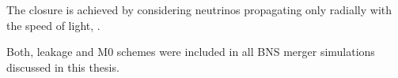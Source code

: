 %
%
%
The closure is achieved by considering neutrinos propagating only radially 
with the speed of light, %
\citep{Radice:2016dwd,Radice:2018pdn}.

Both, leakage and M0 schemes were included in all \ac{BNS} merger 
simulations discussed in this thesis.

%



